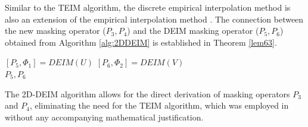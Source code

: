 \documentclass{article}
\begin{document}
Similar to the TEIM algorithm, the discrete empirical interpolation method \cite{DEIM} is also an extension of the empirical interpolation method \cite{EIM}. The connection between the new masking operator ($P_3,P_4$) and the DEIM masking operator ($P_5,P_6$) obtained from Algorithm \ref{alg:2DDEIM} is established in Theorem \ref{lem63}.  
\begin{scriptsize}
\begin{algorithm}
\caption{2D-DEIM. See \cite{DEIM} or appendix for DEIM algorithm}\label{alg:2DDEIM}
\begin{algorithmic}
\State $[P_5,\Phi_1]=DEIM(U)$
\State $[P_6,\Phi_2]=DEIM(V)$\\
\Return $P_5,P_6$
\end{algorithmic}
\end{algorithm}
\end{scriptsize}

The 2D-DEIM algorithm allows for the direct derivation of masking operators $P_3$ and  $P_4$, eliminating the need for the TEIM algorithm, which was employed in \cite{MatrixDEIM} without any accompanying mathematical justification.
\end{document}

